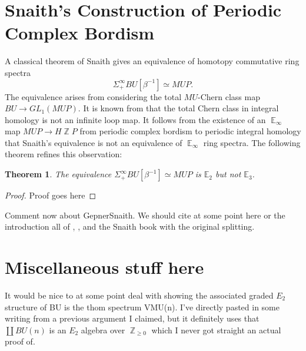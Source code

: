 \documentclass[oneside]{amsart}
\theoremstyle{definition}
\theoremstyle{plain}
\newtheorem{thm}[nul]{Theorem}
\DeclareMathOperator{\Z}{\mathbb{Z}}
\DeclareMathOperator{\E}{\mathbb{E}}
\begin{document}
\section{Snaith's Construction of Periodic Complex Bordism} \label{sec:SnaithSplitting}

A classical theorem of Snaith \cite{SnaithOriginal} gives an equivalence of homotopy commutative ring spectra $$\Sigma^{\infty}_+ BU [\beta^{-1}] \simeq MUP.$$  The equivalence arises from considering the total $MU$-Chern class map $BU \to GL_1(MUP).$  It is known from \cite{SnaithNotMultiplicative} that the total Chern class in integral homology is not an infinite loop map.  It follows from the existence of an $\E_\infty$ map $MUP \to H\Z P$ from periodic complex bordism to periodic integral homology that Snaith's equivalence is not an equivalence of $\E_\infty$ ring spectra.  The following theorem refines this observation:



\begin{thm}
The equivalence $\Sigma^{\infty}_+ BU [\beta^{-1}] \simeq MUP$ is $\mathbb{E}_2$ but not $\mathbb{E}_3$.
\end{thm}

\begin{proof}
Proof goes here
\end{proof}

Comment now about GepnerSnaith.
We should cite at some point here or the introduction all of \cite{SnaithNotMultiplicative},  \cite{GepnerSnaith}, and the Snaith book with the original splitting.

\section{Miscellaneous stuff here}

It would be nice to at some point deal with showing the associated graded $E_2$ structure of BU is the thom spectrum VMU(n).  I've directly pasted in some writing from a previous argument I claimed, but it definitely uses that $\coprod BU(n)$ is an $E_2$ algebra over $\Z _{\geq 0}$ which I never got straight an actual proof of.  
\end{document}
